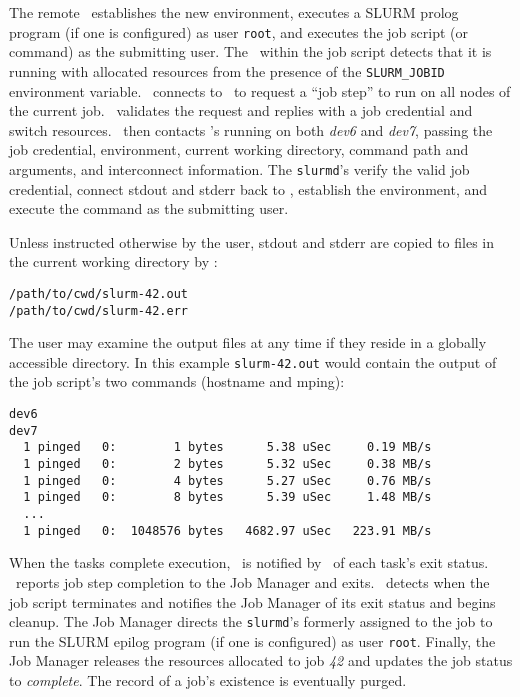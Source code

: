 The remote \slurmd\ establishes the new environment, executes a SLURM 
prolog program (if one is configured) as user {\tt root}, and executes the
job script (or command) as the submitting user. The \srun\ within the job script 
detects that it is running with allocated resources from the presence
of the {\tt SLURM\_JOBID} environment variable. \srun\ connects to
\slurmctld\ to request a ``job step'' to run on all nodes of the current
job. \slurmctld\ validates the request and replies with a job credential
and switch resources. \srun\ then contacts \slurmd 's running on both
{\em dev6} and {\em dev7}, passing the job credential, environment,
current working directory, command path and arguments, and interconnect
information. The {\tt slurmd}'s verify the valid job credential, connect
stdout and stderr back to \srun , establish the environment, and execute
the command as the submitting user.

Unless instructed otherwise by the user, stdout and stderr are
copied to files in the current working directory by \srun :

\begin{verbatim}
/path/to/cwd/slurm-42.out
/path/to/cwd/slurm-42.err
\end{verbatim}

The user may examine the output files at any time if they reside 
in a globally accessible directory. In this example
{\tt slurm-42.out} would  contain the output of the job script's two 
commands (hostname and mping):

\begin{verbatim}
dev6
dev7
  1 pinged   0:        1 bytes      5.38 uSec     0.19 MB/s                     
  1 pinged   0:        2 bytes      5.32 uSec     0.38 MB/s                     
  1 pinged   0:        4 bytes      5.27 uSec     0.76 MB/s                     
  1 pinged   0:        8 bytes      5.39 uSec     1.48 MB/s                     
  ...
  1 pinged   0:  1048576 bytes   4682.97 uSec   223.91 MB/s              
\end{verbatim}

When the tasks complete execution, \srun\ is notified by \slurmd\ of each
task's exit status. \srun\ reports job step completion to the Job Manager
and exits. 
\slurmd\ detects when the job script terminates and notifies
the Job Manager of its exit status and begins cleanup. 
The Job Manager directs the {\tt slurmd}'s formerly assigned to the
job to run the SLURM epilog program (if one is configured) as user 
{\tt root}. 
Finally, the Job Manager releases the resources allocated to job {\em 42}
and updates the job status to {\em complete}. The record of a job's
existence is eventually purged.

